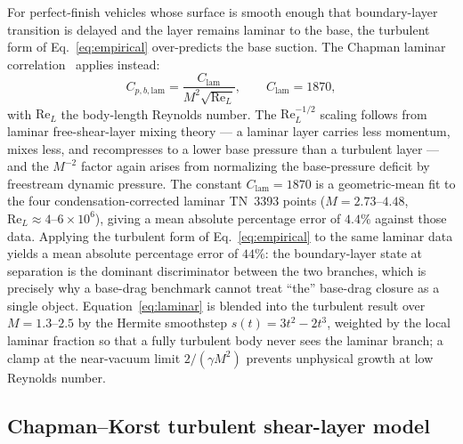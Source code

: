 For perfect-finish vehicles whose surface is smooth enough that boundary-layer
transition is delayed and the layer remains laminar to the base, the turbulent
form of Eq.~\eqref{eq:empirical} over-predicts the base suction. The Chapman
laminar correlation~\cite{chapman1950} applies instead:
%
\begin{equation}
C_{p,b,\text{lam}} = \frac{C_{\text{lam}}}{M^{2}\sqrt{\mathrm{Re}_{L}}} ,
\qquad C_{\text{lam}} = 1870 ,
\label{eq:laminar}
\end{equation}
%
with $\mathrm{Re}_{L}$ the body-length Reynolds number. The $\mathrm{Re}_{L}^{-1/2}$
scaling follows from laminar free-shear-layer mixing theory --- a laminar layer
carries less momentum, mixes less, and recompresses to a lower base pressure than
a turbulent layer --- and the $M^{-2}$ factor again arises from normalizing the
base-pressure deficit by freestream dynamic pressure. The constant
$C_{\text{lam}} = 1870$ is a geometric-mean fit to the four condensation-corrected
laminar TN~3393 points ($M = 2.73$--$4.48$, $\mathrm{Re}_{L} \approx 4$--$6 \times
10^{6}$), giving a mean absolute percentage error of $4.4\%$ against those data.
Applying the turbulent form of Eq.~\eqref{eq:empirical} to the same laminar data
yields a mean absolute percentage error of $44\%$: the boundary-layer state at
separation is the dominant discriminator between the two branches, which is
precisely why a base-drag benchmark cannot treat ``the'' base-drag closure
as a single object. Equation~\eqref{eq:laminar} is blended into the turbulent
result over $M = 1.3$--$2.5$ by the Hermite smoothstep $s(t) = 3t^{2} - 2t^{3}$,
weighted by the local laminar fraction so that a fully turbulent body never sees
the laminar branch; a clamp at the near-vacuum limit $2/(\gamma M^{2})$ prevents
unphysical growth at low Reynolds number.

\subsection{Chapman--Korst turbulent shear-layer model}
\label{subsec:chapmankorst}

